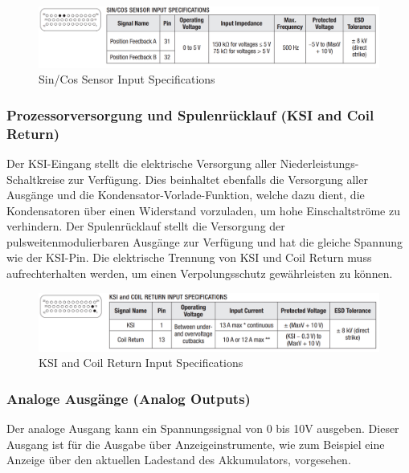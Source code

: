 \begin{figure}[H]
	\begin{center}
		\includegraphics[width=\textwidth]{figures/antrieb/SinCosSensor_Input_Specifications.png}
		\caption{Sin/Cos Sensor Input Specifications}
	\end{center}
\end{figure}


\newpage


\subsubsection{Prozessorversorgung und Spulenrücklauf (KSI and Coil Return)}
Der KSI-Eingang stellt die elektrische Versorgung aller Niederleistungs-Schaltkreise zur Verfügung. Dies  beinhaltet ebenfalls die Versorgung aller Ausgänge und die Kondensator-Vorlade-Funktion, welche dazu dient, die Kondensatoren über einen Widerstand vorzuladen, um hohe Einschaltströme zu verhindern. Der Spulenrücklauf stellt die Versorgung der pulsweitenmodulierbaren Ausgänge zur Verfügung und hat die gleiche Spannung wie der KSI-Pin. Die elektrische Trennung von KSI und Coil Return muss aufrechterhalten werden, um einen Verpolungsschutz gewährleisten zu können. 

\begin{figure}[H]
	\begin{center}
		\includegraphics[width=\textwidth]{figures/antrieb/KSI_CoilReturn_Input_Specifications.png}
		\caption{KSI and Coil Return Input Specifications}
	\end{center}
\end{figure}



\subsubsection{Analoge Ausgänge (Analog Outputs)}
Der analoge Ausgang kann ein Spannungssignal von 0 bis 10V ausgeben. Dieser Ausgang ist für die Ausgabe über Anzeigeinstrumente, wie zum Beispiel eine Anzeige über den aktuellen Ladestand des Akkumulators, vorgesehen.

